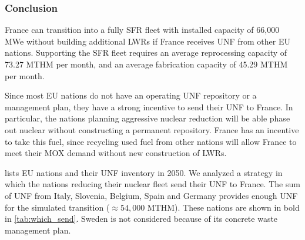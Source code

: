 \documentclass{article}
\begin{document}
\subsubsection{Conclusion}

France can transition into
a fully \gls{SFR} fleet with installed capacity of 66,000 \gls{MWe} without
building additional \glspl{LWR}
if France receives \gls{UNF} from other \gls{EU} nations.
Supporting the \gls{SFR} fleet requires an average 
reprocessing capacity of 73.27 \gls{MTHM} per month,
and an average fabrication capacity of 45.29 \gls{MTHM} per month.

Since most \gls{EU} nations do not have an operating \gls{UNF}
repository or a management plan, they have a strong incentive
to send their \gls{UNF} to France. In particular, the nations
planning aggressive nuclear reduction will be able phase out nuclear
without constructing a permanent repository. France has an
incentive to take this fuel, since recycling used fuel from
other nations will allow France to meet their MOX demand
without new construction of \glspl{LWR}.

 lists \gls{EU} nations and their \gls{UNF} inventory
in 2050. We analyzed a strategy in which 
the nations reducing their nuclear fleet send their \gls{UNF} to France.
The sum of \gls{UNF} from Italy, Slovenia, Belgium, Spain and Germany
provides enough \gls{UNF} for the simulated transition ($\approx 54,000$ MTHM). 
These nations are shown in bold in \cref{tab:which_send}.
Sweden is not considered because of its concrete waste management plan.
\end{document}
